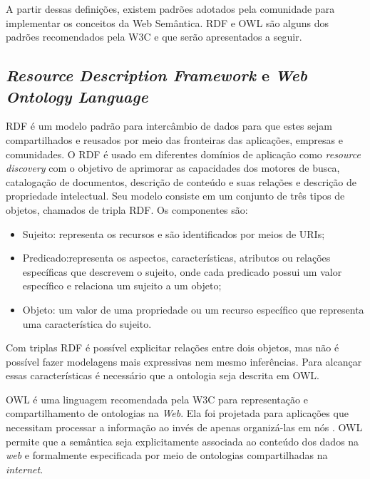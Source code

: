        A partir dessas definições, existem padrões adotados pela comunidade para implementar os conceitos da Web Semântica. RDF e OWL são alguns dos padrões recomendados pela W3C e que serão apresentados a seguir.
        
	\subsection{\textit{Resource Description Framework} e \textit{Web Ontology Language}}
    
    	RDF é um modelo padrão para intercâmbio de dados para que estes sejam compartilhados e reusados por meio das fronteiras das aplicações, empresas e comunidades. O RDF é usado em diferentes domínios de aplicação como \textit{resource discovery} com o objetivo de aprimorar as capacidades dos motores de busca, catalogação de documentos, descrição de conteúdo e suas relações e descrição de propriedade intelectual. Seu modelo consiste em um conjunto de três tipos de objetos, chamados de tripla RDF. Os componentes são:
        
        \begin{itemize}
        	\item Sujeito: representa os recursos e são identificados por meios de URIs;
            \item Predicado:representa os aspectos, características, atributos ou relações específicas que descrevem o sujeito, onde cada predicado possui um valor específico e relaciona um sujeito a um objeto;
            \item Objeto: um valor de uma propriedade ou um recurso específico que representa uma característica do sujeito.
        \end{itemize}
        
        Com triplas RDF é possível explicitar relações entre dois objetos, mas não é possível fazer modelagens mais expressivas nem mesmo inferências. Para alcançar essas características é necessário que a ontologia seja descrita em OWL.
        
        OWL é uma linguagem recomendada pela W3C para representação e compartilhamento de ontologias na \textit{Web}. Ela foi projetada para aplicações que necessitam processar a informação ao invés de apenas organizá-las em nós \cite{Mcguinness2004}. OWL permite que a semântica seja explicitamente associada ao conteúdo dos dados na \textit{web} e formalmente especificada por meio de ontologias compartilhadas na \textit{internet}.
        
